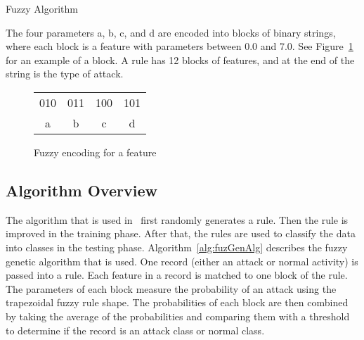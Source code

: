 \documentclass{sig-alternate}
\begin{document}
\begin{algorithm}
\caption{Fuzzy Algorithm}
\label{alg:fuzAlg}
\begin{algorithmic}
\ELSE {}
\ENDIF
\end{algorithmic}
\end{algorithm}

The four parameters a, b, c, and d are encoded into blocks of binary strings, where each block is a feature with parameters between 0.0 and 7.0. See Figure~\ref{fig:fuzEncodingForFeature} for an example of a block. A rule has 12 blocks of features, and at the end of the string is the type of attack.

\begin{figure}
\centering
\caption{Fuzzy encoding for a feature}
\begin{tabular}{|c|c|c|c|} \hline
010 & 011 & 100 & 101\\
a & b & c & d\\
\hline\end{tabular}
\label{fig:fuzEncodingForFeature}
\end{figure}




\subsection{Algorithm Overview}
The algorithm that is used in~\cite{6496342, 6559603} first randomly generates a rule. Then the rule is improved in the training phase. After that, the rules are used to classify the data into classes in the testing phase. Algorithm~\ref{alg:fuzGenAlg} describes the fuzzy genetic algorithm that is used. One record (either an attack or normal activity) is passed into a rule. Each feature in a record is matched to one block of the rule. The parameters of each block measure the probability of an attack using the trapezoidal fuzzy rule shape. The probabilities of each block are then combined by taking the average of the probabilities and comparing them with a threshold to determine if the record is an attack class or normal class.
\end{document}
